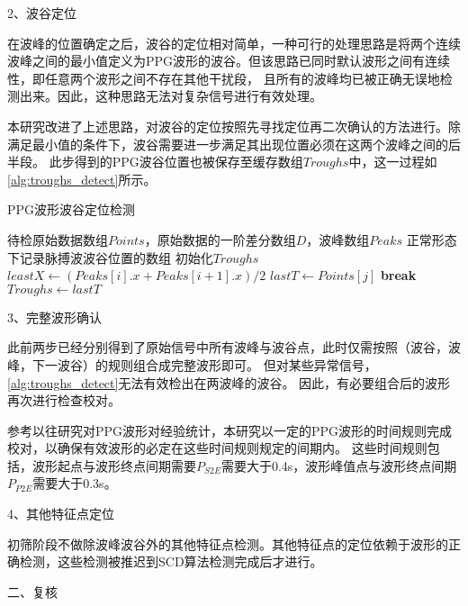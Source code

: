 2、波谷定位

在波峰的位置确定之后，波谷的定位相对简单，一种可行的处理思路是将两个连续波峰之间的最小值定义为PPG波形的波谷。但该思路已同时默认波形之间有连续性，即任意两个波形之间不存在其他干扰段，
且所有的波峰均已被正确无误地检测出来。因此，这种思路无法对复杂信号进行有效处理。

本研究改进了上述思路，对波谷的定位按照先寻找定位再二次确认的方法进行。除满足最小值的条件下，波谷需要进一步满足其出现位置必须在这两个波峰之间的后半段。
此步得到的PPG波谷位置也被保存至缓存数组$Troughs$中，这一过程如\autoref{alg:troughs_detect}所示。
\begin{breakablealgorithm}
    \caption{PPG波形波谷定位检测}
    \label{alg:troughs_detect}
    \begin{algorithmic}[1] %
        \Require 待检原始数据数组$Points$，原始数据的一阶差分数组$D$，波峰数组$Peaks$
        \Ensure 正常形态下记录脉搏波波谷位置的数组
            \State 初始化$Troughs$
                \State $leastX \gets (Peaks[i].x + Peaks[i+1].x )/2$
                            \State $lastT \gets Points[j]$
                            \State \textbf{break}
                        \EndIf
                    \EndFor
                \State $Troughs \gets lastT$
            \EndFor
            \State {}
        \EndFunction
    \end{algorithmic}
\end{breakablealgorithm}

3、完整波形确认

此前两步已经分别得到了原始信号中所有波峰与波谷点，此时仅需按照（波谷，波峰，下一波谷）的规则组合成完整波形即可。
但对某些异常信号，\autoref{alg:troughs_detect}无法有效检出在两波峰的波谷。
因此，有必要组合后的波形再次进行检查校对。

参考以往研究对PPG波形对经验统计，本研究以一定的PPG波形的时间规则完成校对，以确保有效波形的必定在这些时间规则规定的间期内。
这些时间规则包括，波形起点与波形终点间期需要$P_{S2E}$需要大于0.4s，波形峰值点与波形终点间期$P_{P2E}$需要大于0.3s。

4、其他特征点定位

初筛阶段不做除波峰波谷外的其他特征点检测。其他特征点的定位依赖于波形的正确检测，这些检测被推迟到SCD算法检测完成后才进行。

二、复核

